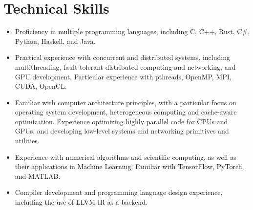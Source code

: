 \documentclass[letterpaper,11pt]{article}
\begin{document}
\section{Technical Skills}

\begin{itemize}[leftmargin=0.15in, label={-}]

  \item Proficiency in multiple programming languages, including C, C++, Rust, C\#, Python, Haskell, and Java.
  
  \item Practical experience with concurrent and distributed systems, including multithreading, fault-tolerant distributed computing and networking, and GPU development. Particular experience with pthreads, OpenMP, MPI, CUDA, OpenCL. 

  \item Familiar with computer architecture principles, with a particular focus on operating system development, heterogeneous computing and cache-aware optimization. Experience optimizing highly parallel code for CPUs and GPUs, and developing low-level systems and networking primitives and utilities.
  
  \item Experience with numerical algorithms and scientific computing, as well as their applications in Machine Learning. Familiar with TensorFlow, PyTorch, and MATLAB.
  
  \item Compiler development and programming language design experience, including the use of LLVM IR as a backend.

\end{itemize}

\end{document}
